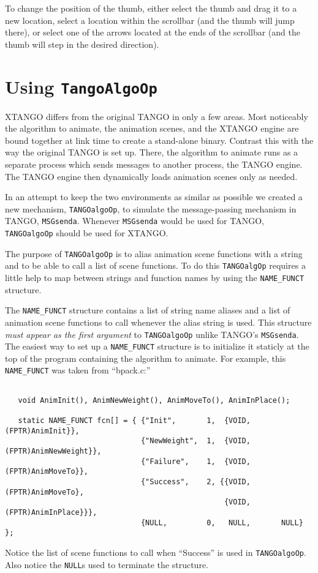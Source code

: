 To change the position of the thumb, either select the thumb and drag
it to a new location, select a location within the scrollbar (and the
thumb will jump there), or select one of the arrows located at the ends
of the scrollbar (and the thumb will step in the desired direction).

\section{Using {\tt TangoAlgoOp}}

XTANGO differs from the original TANGO in only a few areas.  Most
noticeably the algorithm to animate, the animation scenes, and the XTANGO
engine are bound together at link time to create a stand-alone binary.
Contrast this with the way the original TANGO is set up.  There, the algorithm
to animate runs as a separate process which sends messages to another process,
the TANGO engine.  The TANGO engine then dynamically loads animation
scenes only as needed.

In an attempt to keep the two environments as similar as possible we created
a new mechanism, {\tt TANGOalgoOp}, to simulate the message-passing mechanism
in TANGO, {\tt MSGsenda}.  Whenever {\tt MSGsenda} would be used for TANGO,
{\tt TANGOalgoOp} should be used for XTANGO.

The purpose of {\tt TANGOalgoOp} is to alias animation scene functions with a
string and to be able to call a list of scene functions.  To do this
{\tt TANGOalgOp} requires a little help to map between strings and function
names by using the {\tt NAME\_FUNCT} structure.

The {\tt NAME\_FUNCT} structure contains a list of string name aliases and
a list of animation scene functions to call whenever the alias string is
used.  This structure {\em must appear as the first argument}\/ to
{\tt TANGOalgoOp} unlike TANGO's {\tt MSGsenda}.  The easiest way to set up a
{\tt NAME\_FUNCT} structure is to initialize it staticly at the top of the
program containing the algorithm to animate.  For example, this
{\tt NAME\_FUNCT} was taken from ``bpack.c:''
\begin{tt}
\begin{verbatim}

   void AnimInit(), AnimNewWeight(), AnimMoveTo(), AnimInPlace();

   static NAME_FUNCT fcn[] = { {"Init",       1,  {VOID, (FPTR)AnimInit}},
                               {"NewWeight",  1,  {VOID, (FPTR)AnimNewWeight}},
                               {"Failure",    1,  {VOID, (FPTR)AnimMoveTo}},
                               {"Success",    2, {{VOID, (FPTR)AnimMoveTo},
                                                  {VOID, (FPTR)AnimInPlace}}},
                               {NULL,         0,   NULL,       NULL} };

\end{verbatim}
\end{tt}
Notice the list of scene functions to call when ``Success'' is used in
{\tt TANGOalgoOp}.  Also notice the {\tt NULL}s used to terminate the
structure.

